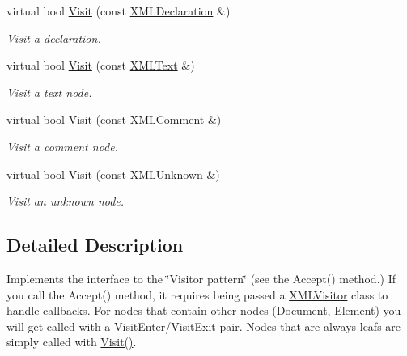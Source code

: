 \begin{DoxyCompactItemize}
\mbox{\label{classtinyxml2_1_1XMLVisitor_adc75bd459fc7ba8223b50f0616767f9a}} 
virtual bool \mbox{\hyperlink{classtinyxml2_1_1XMLVisitor_adc75bd459fc7ba8223b50f0616767f9a}{Visit}} (const \mbox{\hyperlink{classtinyxml2_1_1XMLDeclaration}{X\+M\+L\+Declaration}} \&)
\begin{DoxyCompactList}\small\item\em Visit a declaration. \end{DoxyCompactList}\item 
\mbox{\label{classtinyxml2_1_1XMLVisitor_af30233565856480ea48b6fa0d6dec65b}} 
virtual bool \mbox{\hyperlink{classtinyxml2_1_1XMLVisitor_af30233565856480ea48b6fa0d6dec65b}{Visit}} (const \mbox{\hyperlink{classtinyxml2_1_1XMLText}{X\+M\+L\+Text}} \&)
\begin{DoxyCompactList}\small\item\em Visit a text node. \end{DoxyCompactList}\item 
\mbox{\label{classtinyxml2_1_1XMLVisitor_acc8147fb5a85f6c65721654e427752d7}} 
virtual bool \mbox{\hyperlink{classtinyxml2_1_1XMLVisitor_acc8147fb5a85f6c65721654e427752d7}{Visit}} (const \mbox{\hyperlink{classtinyxml2_1_1XMLComment}{X\+M\+L\+Comment}} \&)
\begin{DoxyCompactList}\small\item\em Visit a comment node. \end{DoxyCompactList}\item 
\mbox{\label{classtinyxml2_1_1XMLVisitor_a14e4748387c34bf53d24e8119bb1f292}} 
virtual bool \mbox{\hyperlink{classtinyxml2_1_1XMLVisitor_a14e4748387c34bf53d24e8119bb1f292}{Visit}} (const \mbox{\hyperlink{classtinyxml2_1_1XMLUnknown}{X\+M\+L\+Unknown}} \&)
\begin{DoxyCompactList}\small\item\em Visit an unknown node. \end{DoxyCompactList}\end{DoxyCompactItemize}


\subsection{Detailed Description}
Implements the interface to the \char`\"{}\+Visitor pattern\char`\"{} (see the Accept() method.) If you call the Accept() method, it requires being passed a \mbox{\hyperlink{classtinyxml2_1_1XMLVisitor}{X\+M\+L\+Visitor}} class to handle callbacks. For nodes that contain other nodes (Document, Element) you will get called with a Visit\+Enter/\+Visit\+Exit pair. Nodes that are always leafs are simply called with \mbox{\hyperlink{classtinyxml2_1_1XMLVisitor_adc75bd459fc7ba8223b50f0616767f9a}{Visit()}}.

